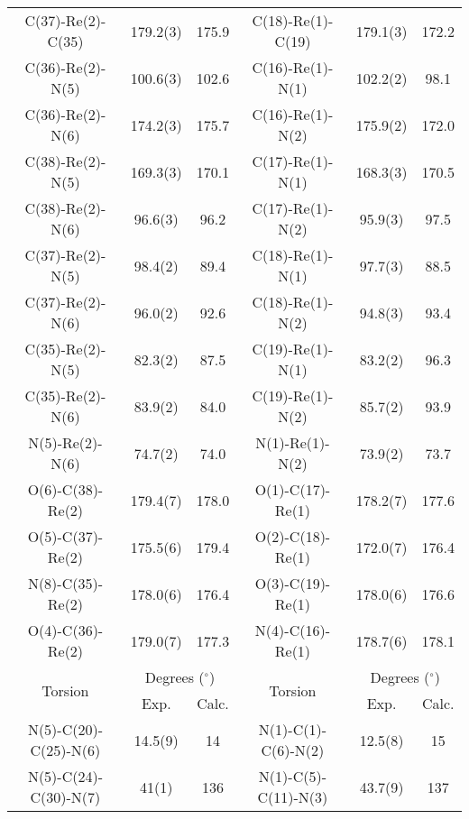 \begin{table}[htb]
{\begin{tabular}{cccccc}
    C(37)-Re(2)-C(35) & 179.2(3) & 175.9 & C(18)-Re(1)-C(19) & 179.1(3) & 172.2 \\
    C(36)-Re(2)-N(5) & 100.6(3) & 102.6 & C(16)-Re(1)-N(1) & 102.2(2) & 98.1 \\
    C(36)-Re(2)-N(6) & 174.2(3) & 175.7 & C(16)-Re(1)-N(2) & 175.9(2) & 172.0 \\
    C(38)-Re(2)-N(5) & 169.3(3) & 170.1 & C(17)-Re(1)-N(1) & 168.3(3) & 170.5 \\
    C(38)-Re(2)-N(6) & 96.6(3) & 96.2 & C(17)-Re(1)-N(2) & 95.9(3) & 97.5 \\
    C(37)-Re(2)-N(5) & 98.4(2) & 89.4 & C(18)-Re(1)-N(1) & 97.7(3) & 88.5 \\
    C(37)-Re(2)-N(6) & 96.0(2) & 92.6 & C(18)-Re(1)-N(2) & 94.8(3) & 93.4 \\
    C(35)-Re(2)-N(5) & 82.3(2) & 87.5 & C(19)-Re(1)-N(1) & 83.2(2) & 96.3 \\
    C(35)-Re(2)-N(6) & 83.9(2) & 84.0 & C(19)-Re(1)-N(2) & 85.7(2) & 93.9 \\
    N(5)-Re(2)-N(6) & 74.7(2) & 74.0 & N(1)-Re(1)-N(2) & 73.9(2) & 73.7 \\
    O(6)-C(38)-Re(2) & 179.4(7) & 178.0 & O(1)-C(17)-Re(1) & 178.2(7) & 177.6 \\
    O(5)-C(37)-Re(2) & 175.5(6) & 179.4 & O(2)-C(18)-Re(1) & 172.0(7) & 176.4 \\ 
    N(8)-C(35)-Re(2) & 178.0(6) & 176.4 & O(3)-C(19)-Re(1) & 178.0(6) & 176.6 \\
    O(4)-C(36)-Re(2) & 179.0(7) & 177.3 & N(4)-C(16)-Re(1) & 178.7(6) & 178.1 \\ \midrule
    \multirow{2}{*}{Torsion} & \multicolumn{2}{c}{Degrees ($^\circ$)} & \multirow{2}{*}{Torsion} & \multicolumn{2}{c}{Degrees ($^\circ$)} \\ \cline{2-3} \cline {5-6}
     & Exp. & Calc. & & Exp. & Calc. \\ \midrule
    N(5)-C(20)-C(25)-N(6) & 14.5(9) & 14 & N(1)-C(1)-C(6)-N(2) & 12.5(8) & 15 \\
    N(5)-C(24)-C(30)-N(7) & 41(1) & 136 & N(1)-C(5)-C(11)-N(3) & 43.7(9) & 137 \\
    \bottomrule
    \end{tabular}}%
  \label{tab.da5}%
\end{table}%


